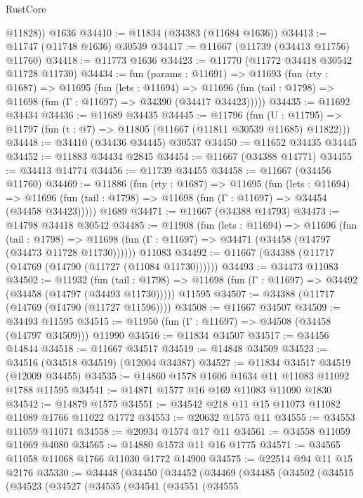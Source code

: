 \begin{lexlean}{RustCore}
\begin{coremodule}
        @11828))
    @1636
@34410 := @11834 (@34383 (@11684 @1636))
@34413 := @11747 (@11748 @1636) @30539
@34417 := @11667 (@11739 (@34413 @11756) @11760)
@34418 := @11773 @1636
@34423 := @11770 (@11772 @34418 @30542 @11728 @11730)
@34434 := fun (params : @11691) =>
  @11693
    (fun (rty : @1687) =>
    @11695
      (fun (lets : @11694) =>
      @11696 (fun (tail : @1798) => @11698 (fun (Γ : @11697) => @34390 (@34417 @34423)))))
@34435 := @11692 @34434
@34436 := @11689 @34435
@34445 := @11796
    (fun (U : @11795) => @11797 (fun (t : @7) => @11805 (@11667 (@11811 @30539 @11685) @11822)))
@34448 := @34410 (@34436 @34445) @30537
@34450 := @11652 @34435 @34445
@34452 := @11883 @34434 @2845
@34454 := @11667 (@34388 @14771)
@34455 := @34413 @14774
@34456 := @11739 @34455
@34458 := @11667 (@34456 @11760)
@34469 := @11886
    (fun (rty : @1687) =>
    @11695
      (fun (lets : @11694) =>
      @11696 (fun (tail : @1798) => @11698 (fun (Γ : @11697) => @34454 (@34458 @34423)))))
    @1689
@34471 := @11667 (@34388 @14793)
@34473 := @14798 @34418 @30542
@34485 := @11908
    (fun (lets : @11694) =>
    @11696
      (fun (tail : @1798) =>
      @11698 (fun (Γ : @11697) => @34471 (@34458 (@14797 (@34473 @11728 @11730))))))
    @11083
@34492 := @11667 (@34388 (@11717 (@14769 (@14790 (@11727 (@11084 @11730))))))
@34493 := @34473 @11083
@34502 := @11932
    (fun (tail : @1798) => @11698 (fun (Γ : @11697) => @34492 (@34458 (@14797 (@34493 @11730)))))
    @11595
@34507 := @34388 (@11717 (@14769 (@14790 (@11727 @11596))))
@34508 := @11667 @34507
@34509 := @34493 @11595
@34515 := @11950 (fun (Γ : @11697) => @34508 (@34458 (@14797 @34509))) @11990
@34516 := @11834 @34507
@34517 := @34456 @14844
@34518 := @11667 @34517
@34519 := @14848 @34509
@34523 := @34516 (@34518 @34519) (@12004 @34387)
@34527 := @11834 @34517 @34519 (@12009 @34455)
@34535 := @14860 @1578 @1606 @1634 @11 @11083 @11092 @1788 @11595
@34541 := @14871 @1577 @16 @169 @11083 @11090 @1830
@34542 := @14879 @1575
@34551 := @34542 @218 @11 @15 @11073 @11082 @11089 @1766 @11022 @1772
@34553 := @20632 @1575 @11
@34555 := @34553 @11059 @11071
@34558 := @20934 @1574 @17 @11
@34561 := @34558 @11059 @11069 @4080
@34565 := @14880 @1573 @11 @16 @1775
@34571 := @34565 @11058 @11068 @1766 @11030 @1772 @14900
@34575 := @22514 @94 @11 @15 @2176
@35330 := @34448
    (@34450
      (@34452
        (@34469
          (@34485
            (@34502
              (@34515
                (@34523
                  (@34527
                    (@34535
                      (@34541
                        (@34551
                          (@34555

\end{coremodule}
\end{lexlean}
